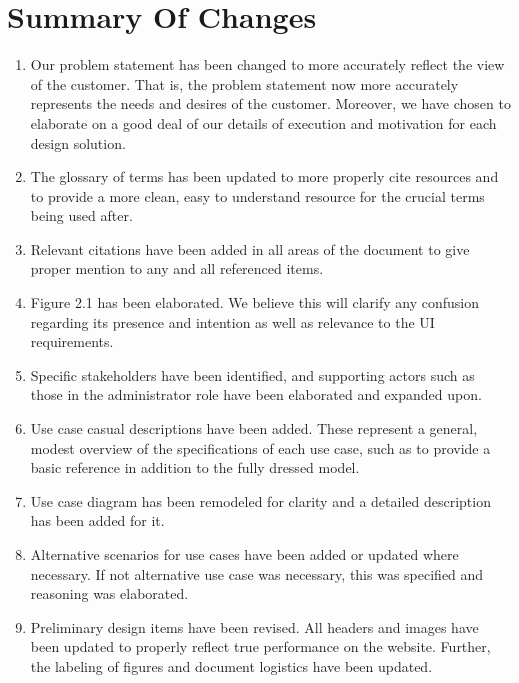 \chapter*{Summary Of Changes}

\begin{enumerate}

\item Our problem statement has been changed to more accurately reflect the view of the customer. That is, the problem statement now more accurately represents the needs and desires of the customer. Moreover, we have chosen to elaborate on a good deal of our details of execution and motivation for each design solution.

\item The glossary of terms has been updated to more properly cite resources and to provide a more clean, easy to understand resource for the crucial terms being used after. 

\item Relevant citations have been added in all areas of the document to give proper mention to any and all referenced items.

\item Figure 2.1 has been elaborated. We believe this will clarify any confusion regarding its presence and intention as well as relevance to the UI requirements.

\item Specific stakeholders have been identified, and supporting actors such as those in the administrator role have been elaborated and expanded upon.

\item Use case casual descriptions have been added. These represent a general, modest overview of the specifications of each use case, such as to provide a basic reference in addition to the fully dressed model.

\item Use case diagram has been remodeled for clarity and a detailed description has been added for it. 

\item Alternative scenarios for use cases have been added or updated where necessary. If not alternative use case was necessary, this was specified and reasoning was elaborated.

\item Preliminary design items have been revised. All headers and images have been updated to properly reflect true performance on the website. Further, the labeling of figures and document logistics have been updated.


\end{enumerate}
